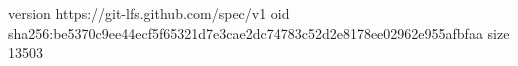 version https://git-lfs.github.com/spec/v1
oid sha256:be5370c9ee44ecf5f65321d7e3cae2dc74783c52d2e8178ee02962e955afbfaa
size 13503
